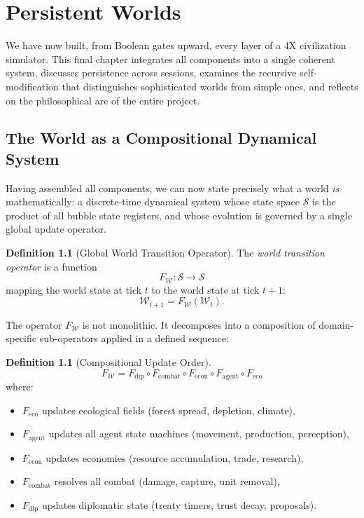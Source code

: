 \documentclass[11pt,a4paper,openany]{book}
\theoremstyle{plain}
\theoremstyle{definition}
\newtheorem{definition}[theorem]{Definition}
\theoremstyle{remark}
\newenvironment{background}{%
  \begin{mdframed}[
    linecolor=sphereblue!40, backgroundcolor=sphereblue!5,
    linewidth=1pt, innertopmargin=8pt, innerbottommargin=8pt,
    innerleftmargin=10pt, innerrightmargin=10pt,
    skipabove=10pt, skipbelow=6pt
  ]%
  \setlength{\parindent}{0pt}%
  \noindent{\textcolor{sphereblue}{\textbf{Background}}}\par\smallskip\ignorespaces
}{\end{mdframed}}
\newcommand{\world}{\ensuremath{\mathcal{W}}}
\newcommand{\Fworld}{F_{\mathcal{W}}}
\newcommand{\Feco}{F_{\mathrm{eco}}}
\newcommand{\Fagent}{F_{\mathrm{agent}}}
\newcommand{\Fecon}{F_{\mathrm{econ}}}
\newcommand{\Fcombat}{F_{\mathrm{combat}}}
\newcommand{\Fdip}{F_{\mathrm{dip}}}
\begin{document}
\chapter{Persistent Worlds}
\label{ch:persistent}

\begin{background}
  We have now built, from Boolean gates upward, every layer of a 4X
  civilization simulator. This final chapter integrates all components
  into a single coherent system, discusses persistence across sessions,
  examines the recursive self-modification that distinguishes sophisticated
  worlds from simple ones, and reflects on the philosophical arc of the
  entire project.
\end{background}


\section{The World as a Compositional Dynamical System}
\label{sec:worldtransition}

Having assembled all components, we can now state precisely what a
world \emph{is} mathematically: a discrete-time dynamical system whose
state space $\mathcal{S}$ is the product of all bubble state registers,
and whose evolution is governed by a single global update operator.

\begin{definition}[Global World Transition Operator]
  The \emph{world transition operator} is a function
  \[
    \Fworld : \mathcal{S} \to \mathcal{S}
  \]
  mapping the world state at tick $t$ to the world state at tick $t+1$:
  \[
    \world_{t+1} = \Fworld(\world_t).
  \]
\end{definition}

The operator $\Fworld$ is not monolithic. It decomposes into a composition
of domain-specific sub-operators applied in a defined sequence:

\begin{definition}[Compositional Update Order]
  \[
    \Fworld =
    \Fdip \circ \Fcombat \circ \Fecon \circ \Fagent \circ \Feco
  \]
  where:
  \begin{itemize}
    \item $\Feco$ updates ecological fields (forest spread, depletion, climate),
    \item $\Fagent$ updates all agent state machines (movement, production, perception),
    \item $\Fecon$ updates economies (resource accumulation, trade, research),
    \item $\Fcombat$ resolves all combat (damage, capture, unit removal),
    \item $\Fdip$ updates diplomatic state (treaty timers, trust decay, proposals).
  \end{itemize}
\end{definition}
\end{document}
